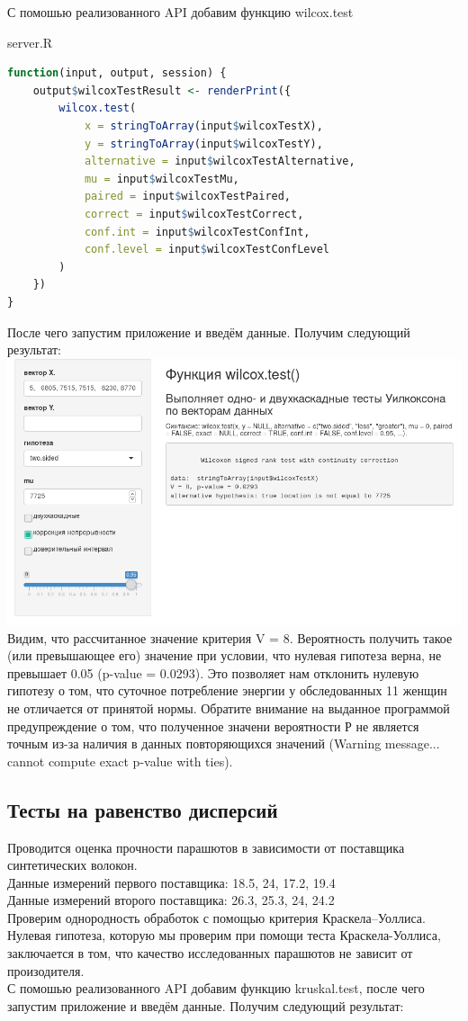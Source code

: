 \documentclass[14pt,a4paper]{scrartcl}
\begin{document}
	С помошью реализованного API добавим функцию wilcox.test

    server.R
    \begin{lstlisting}[language=R]
function(input, output, session) {
    output$wilcoxTestResult <- renderPrint({
        wilcox.test(
            x = stringToArray(input$wilcoxTestX),
            y = stringToArray(input$wilcoxTestY),
            alternative = input$wilcoxTestAlternative,
            mu = input$wilcoxTestMu,
            paired = input$wilcoxTestPaired,
            correct = input$wilcoxTestCorrect,
            conf.int = input$wilcoxTestConfInt,
            conf.level = input$wilcoxTestConfLevel
        )
    })
}
    \end{lstlisting}

    После чего запустим приложение и введём данные. Получим следующий результат:\\
    \includegraphics[width=\textwidth]{wilcox.png}
    Видим, что рассчитанное значение критерия V = 8. Вероятность получить такое (или превышающее его) значение при условии, что нулевая гипотеза верна, не превышает 0.05 (p-value = 0.0293). Это позволяет нам отклонить нулевую гипотезу о том, что суточное потребление энергии у обследованных 11 женщин не отличается от принятой нормы. Обратите внимание на выданное программой предупреждение о том, что полученное значени вероятности Р не является точным из-за наличия в данных повторяющихся значений (Warning message... cannot compute exact p-value with ties).

    \subsection{Тесты на равенство дисперсий}
    Проводится оценка прочности парашютов в зависимости от поставщика синтетических волокон.\\
    Данные измерений первого поставщика: 18.5, 24, 17.2, 19.4\\
    Данные измерений второго поставщика: 26.3, 25.3, 24, 24.2\\
    Проверим однородность обработок с помощью критерия Краскела–Уоллиса. Нулевая гипотеза, которую мы проверим при помощи теста Краскела-Уоллиса, заключается в том, что качество исследованных парашютов не зависит от произодителя.\\
    С помошью реализованного API добавим функцию kruskal.test, после чего запустим приложение и введём данные. Получим следующий результат:\\
\end{document}
